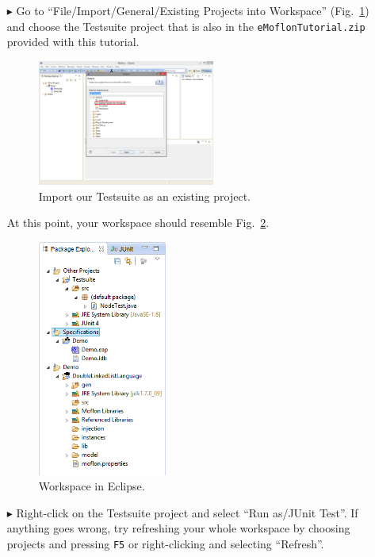 \begin{enumerate}
\item[$\blacktriangleright$] Go to ``File/Import/General/Existing Projects into Workspace'' (Fig.~\ref{fig_eclipseTestsuiteImport}) and choose the Testsuite project that is also in the \texttt{eMoflonTutorial.zip} provided with this tutorial. 
\begin{figure}[htbp]
	\centering
  \includegraphics[width=0.55\textwidth]{../installation_images/eclipse_testsuitimport.png}
	\caption{Import our Testsuite as an existing project.}
	\label{fig_eclipseTestsuiteImport}
\end{figure} 

\item[] At this point, your workspace should resemble Fig.~\ref{fig_eclipsepackageexplorer}.
\begin{figure}[htbp]
	\centering
  \includegraphics[width=0.4\textwidth]{../installation_images/eclipse_packageexplorer.png}
	\caption{Workspace in Eclipse.}
	\label{fig_eclipsepackageexplorer}
\end{figure}

\item[$\blacktriangleright$] Right-click on the Testsuite project and select ``Run as/JUnit Test''.
If anything goes wrong, try refreshing your whole workspace by choosing projects and pressing \texttt{F5} or right-clicking and selecting ``Refresh''.


\end{enumerate}
